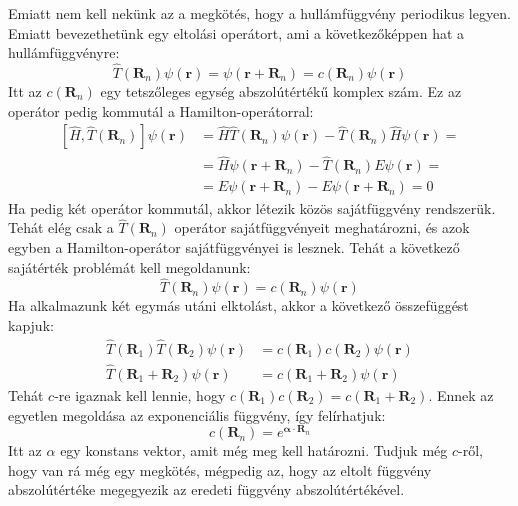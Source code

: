 \documentclass[../main.tex]{subfiles}
\begin{document}
Emiatt nem kell nekünk az a megkötés, hogy a hullámfüggvény periodikus legyen. Emiatt bevezethetünk egy eltolási operátort, ami a következőképpen hat a hullámfüggvényre:
\begin{equation}
    \hat{T}(\mathbf{R}_n) \psi(\mathbf{r}) = \psi(\mathbf{r} + \mathbf{R}_n) = c(\mathbf{R}_n) \psi(\mathbf{r})
\end{equation}
Itt az $c(\mathbf{R}_n)$ egy tetszőleges egység abszolútértékű komplex szám. Ez az operátor pedig kommutál a Hamilton-operátorral:
\begin{equation}
    \begin{aligned}
        [\hat{H}, \hat{T}(\mathbf{R}_n)]\psi(\mathbf{r}) &=  \hat{H} \hat{T}(\mathbf{R}_n) \psi(\mathbf{r}) - \hat{T}(\mathbf{R}_n) \hat{H} \psi(\mathbf{r}) = \\
        &= \hat{H} \psi(\mathbf{r} + \mathbf{R}_n) - \hat{T}(\mathbf{R}_n) E \psi(\mathbf{r}) = \\
        &= E \psi(\mathbf{r} + \mathbf{R}_n) - E \psi(\mathbf{r} + \mathbf{R}_n) = 0
    \end{aligned}
\end{equation}
Ha pedig két operátor kommutál, akkor létezik közös sajátfüggvény rendszerük. Tehát elég csak a $\hat{T}(\mathbf{R}_n)$ operátor sajátfüggvényeit meghatározni, és azok egyben a Hamilton-operátor sajátfüggvényei is lesznek.
Tehát a következő sajátérték problémát kell megoldanunk:
\begin{equation}
    \hat{T}(\mathbf{R}_n) \psi(\mathbf{r}) = c(\mathbf{R}_n) \psi(\mathbf{r})
\end{equation}
Ha alkalmazunk két egymás utáni elktolást, akkor a következő összefüggést kapjuk:
\begin{equation}
    \begin{aligned}
        \hat{T}(\mathbf{R}_1) \hat{T}(\mathbf{R}_2) \psi(\mathbf{r}) &= c(\mathbf{R}_1) c(\mathbf{R}_2) \psi(\mathbf{r}) \\
        \hat{T}(\mathbf{R}_1 + \mathbf{R}_2) \psi(\mathbf{r}) &= c(\mathbf{R}_1 + \mathbf{R}_2) \psi(\mathbf{r})
    \end{aligned}
\end{equation}
Tehát $c$-re igaznak kell lennie, hogy $c(\mathbf{R}_1) c(\mathbf{R}_2) = c(\mathbf{R}_1 + \mathbf{R}_2)$. Ennek az egyetlen megoldása az exponenciális függvény, így felírhatjuk:
\begin{equation}
    c(\mathbf{R}_n) = e^{\boldsymbol{\alpha} \cdot \mathbf{R}_n}
\end{equation}
Itt az $\alpha$ egy konstans vektor, amit még meg kell határozni. Tudjuk még $c$-ről, hogy van rá még egy megkötés, mégpedig az, hogy az eltolt függvény abszolútértéke megegyezik az eredeti függvény abszolútértékével.
\end{document}
